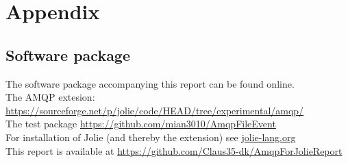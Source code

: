 \section{Appendix}
\subsection{Software package}
The software package accompanying this report can be found online.\\
The AMQP extesion:
\url{https://sourceforge.net/p/jolie/code/HEAD/tree/experimental/amqp/}\\
The test package
\url{https://github.com/mian3010/AmqpFileEvent}\\
For installation of Jolie (and thereby the extension) see \url{jolie-lang.org}\\
This report is available at \url{https://github.com/Claus35-dk/AmqpForJolieReport}
\newpage